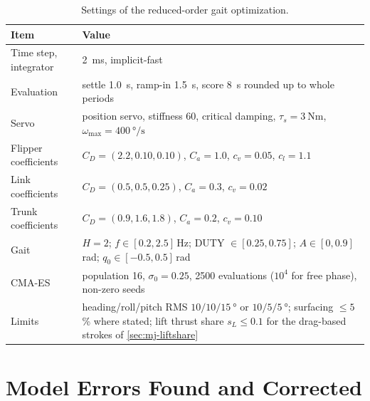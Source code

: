 \begin{table}[H]
  \centering
  \caption[MuJoCo settings]{Settings of the reduced-order gait optimization.}
  \label{tab:app-mujoco}
  \small
  \begin{tabularx}{\textwidth}{@{}l>{\raggedright\arraybackslash}X@{}}
    \toprule
    Item & Value \\
    \midrule
    Time step, integrator & \SI{2}{\milli\second}, implicit-fast \\
    Evaluation & settle \SI{1.0}{\second}, ramp-in \SI{1.5}{\second}, score \SI{8}{\second} rounded up to whole periods \\
    Servo & position servo, stiffness 60, critical damping, $\tau_s=\SI{3}{\newton\metre}$, $\omega_\text{max}=\SI{400}{\degree\per\second}$ \\
    Flipper coefficients & $C_D=(2.2,0.10,0.10)$, $C_a=1.0$, $c_v=0.05$, $c_l=1.1$ \\
    Link coefficients & $C_D=(0.5,0.5,0.25)$, $C_a=0.3$, $c_v=0.02$ \\
    Trunk coefficients & $C_D=(0.9,1.6,1.8)$, $C_a=0.2$, $c_v=0.10$ \\
    Gait & $H=2$; $f\in[0.2,2.5]$\,Hz; DUTY $\in[0.25,0.75]$; $A\in[0,0.9]$\,rad; $q_0\in[-0.5,0.5]$\,rad \\
    CMA-ES & population 16, $\sigma_0=0.25$, 2500 evaluations ($10^4$ for free phase), non-zero seeds \\
    Limits & heading/roll/pitch RMS $10/10/\SI{15}{\degree}$ or $10/5/\SI{5}{\degree}$; surfacing $\le5$\,\% where stated; lift thrust share $s_L\le0.1$ for the drag-based strokes of \cref{sec:mj-liftshare} \\
    \bottomrule
  \end{tabularx}
\end{table}

\section{Model Errors Found and Corrected}

